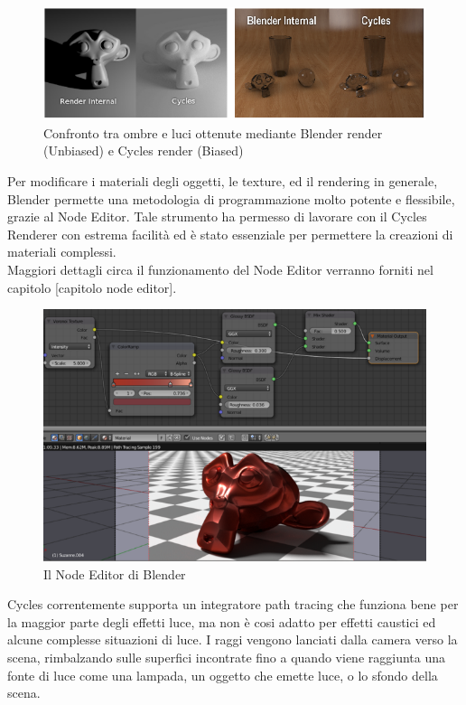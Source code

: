 \begin{figure}[htb]
 \centering
 \includegraphics[width=0.9\linewidth]{images/chapter_tecnologie_abilitanti/tecnologie_abilitanti_bias_unbias.png}\hfill
 \caption[Cycles render e Blender render]{Confronto tra ombre e luci ottenute mediante Blender render (Unbiased) e Cycles render (Biased)}
 \label{fig:tecnologie_abilitanti_bias_unbias}
\end{figure}
Per modificare i materiali degli oggetti, le texture, ed il rendering in generale, Blender permette una metodologia di programmazione molto potente e flessibile, grazie al Node Editor. Tale strumento ha permesso di lavorare con il Cycles Renderer con estrema facilità ed è stato essenziale per permettere la creazioni di materiali complessi. 
\\
Maggiori dettagli circa il funzionamento del Node Editor verranno forniti nel capitolo [capitolo node editor].
\begin{figure}[htb]
 \centering
 \includegraphics[width=1\linewidth]{images/chapter_tecnologie_abilitanti/tecnologie_abilitanti_node_editor.png}\hfill
 \caption[Blender Node Editor]{Il Node Editor di Blender}
 \label{fig:tecnologie_abilitanti_node_editor}
\end{figure}
Cycles correntemente supporta un integratore path tracing che funziona bene per la maggior parte degli effetti luce, ma non è cosi adatto per effetti caustici ed alcune complesse situazioni di luce. I raggi vengono lanciati dalla camera verso la scena, rimbalzando sulle superfici incontrate fino a quando viene raggiunta una fonte di luce come una lampada, un oggetto che emette luce, o lo sfondo della scena. 
